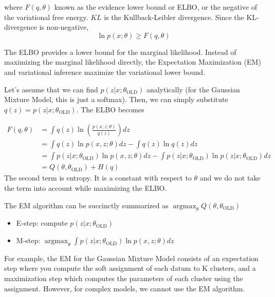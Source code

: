 \documentclass{article}
\DeclareMathOperator*{\argmax}{argmax}
\begin{document}
where $F(q,\theta)$ known as the evidence lower bound or ELBO, or the negative of the variational free energy. $KL$ is the Kullback-Leibler divergence. Since the KL-divergence is non-negative,
\[ \ln p(x;\theta) \geq F(q,\theta) \]

The ELBO provides a lower bound for the marginal likelihood. Instead of maximizing the marginal likelihood directly, the Expectation Maximization (EM) and variational inference maximize the variational lower bound.

Let's assume that we can find $p(z|x; \theta_\text{OLD})$ analytically (for the Gaussian Mixture Model, this is just a softmax). Then, we can simply substitute $q(z)=p(z|x;\theta_\text{OLD})$. The ELBO becomes

\begin{align}
F(q,\theta) &= \int q(z) \ln \left( \frac{p(x,z; \theta)}{q(z)} \right) dz \nonumber \\
&= \int q(z) \ln p(x,z; \theta)  dz - \int q(z) \ln q(z) dz  \nonumber \\
&= \int p(z|x;\theta_\text{OLD}) \ln p(x,z; \theta)  dz - \int p(z|x;\theta_\text{OLD}) \ln p(z|x;\theta_\text{OLD}) dz  \nonumber  \\
&= Q(\theta, \theta_\text{OLD}) + H(q)
\end{align}
The second term is entropy. It is a constant with respect to $\theta$ and we do not take the term into account while maximizing the ELBO.

The EM algorithm can be succinctly summarized as $\argmax_{\theta} Q(\theta, \theta_\text{OLD})$
\begin{itemize}
\item E-step: compute $p(z|x;\theta_\text{OLD})$
\item M-step: $\argmax_{\theta} \int p(z|x;\theta_\text{OLD}) \ln p(x,z; \theta)  dz$
\end{itemize}

For example, the EM for the Gaussian Mixture Model consists of an expectation step where you compute the soft assignment of each datum to K clusters, and a maximization step which computes the parameters of each cluster using the assignment. However, for complex models, we cannot use the EM algorithm.
\end{document}
